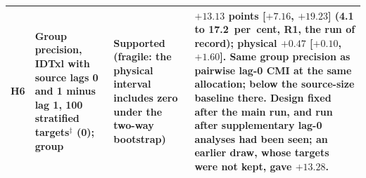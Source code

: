 \begin{table}[tbp]
\begin{tabular}{@{}lL{0.24\textwidth}L{0.17\textwidth}L{0.47\textwidth}@{}}
    \addlinespace
    H6 & Group precision, IDTxl with source lags 0 and 1 minus lag 1, 100 stratified targets$^{\ddagger}$ (0); group & Supported (fragile: the physical interval includes zero under the two-way bootstrap) & $+13.13$ points [$+7.16$, $+19.23$] (4.1 to 17.2~per~cent, R1, the run of record); physical $+0.47$ [$+0.10$, $+1.60$]. Same group precision as pairwise lag-0 CMI at the same allocation; below the source-size baseline there. Design fixed after the main run, and run after supplementary lag-0 analyses had been seen; an earlier draw, whose targets were not kept, gave $+13.28$. \\
    \bottomrule
  \end{tabular}
\end{table}

\begin{table}[tbp]
  \centering
  \scriptsize
  \setlength{\tabcolsep}{4pt}
  \caption[The findings across the systems tested]{The evidence for each finding across the systems tested. AUCs at group level on the recordings (physical where marked) and node-pair level on the chip, within-target or stratified where the chapter cited says so; Donkey Kong on the whole recording unless marked, held-out programs on the clock-aligned samples. Status: P pre-specified (before the main run); H hash-logged (a written prediction, made after the main results and before the test; every held-out result is of this kind); S supplementary (computed after the results, with no written prediction). A dash: not tested on that system.}
  \label{tab:d-contributions}
\end{table}
